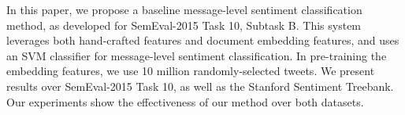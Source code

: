 In this paper, we propose a baseline message-level sentiment classification method, as developed for SemEval-2015 Task 10, Subtask B.  This system leverages both hand-crafted features and document embedding features, and uses an SVM classifier for message-level sentiment classification. In pre-training the embedding features, we use 10 million randomly-selected tweets. We present results over SemEval-2015 Task 10, as well as the Stanford Sentiment Treebank. Our experiments show the effectiveness of our method over both datasets.
